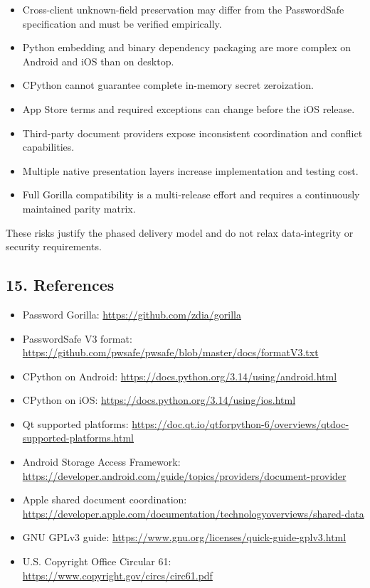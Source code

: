 \documentclass[
  letterpaper,
]{article}
\providecommand{\tightlist}{%
  \setlength{\itemsep}{0pt}\setlength{\parskip}{0pt}}
\begin{document}
\begin{itemize}
\tightlist
\item
  Cross-client unknown-field preservation may differ from the PasswordSafe specification and must be verified
  empirically.
\item
  Python embedding and binary dependency packaging are more complex on Android and iOS than on desktop.
\item
  CPython cannot guarantee complete in-memory secret zeroization.
\item
  App Store terms and required exceptions can change before the iOS release.
\item
  Third-party document providers expose inconsistent coordination and conflict capabilities.
\item
  Multiple native presentation layers increase implementation and testing cost.
\item
  Full Gorilla compatibility is a multi-release effort and requires a continuously maintained parity matrix.
\end{itemize}

These risks justify the phased delivery model and do not relax data-integrity or security requirements.

\subsection{15. References}\label{15-references}

\begin{itemize}
\tightlist
\item
  Password Gorilla: \url{https://github.com/zdia/gorilla}
\item
  PasswordSafe V3 format: \url{https://github.com/pwsafe/pwsafe/blob/master/docs/formatV3.txt}
\item
  CPython on Android: \url{https://docs.python.org/3.14/using/android.html}
\item
  CPython on iOS: \url{https://docs.python.org/3.14/using/ios.html}
\item
  Qt supported platforms: \url{https://doc.qt.io/qtforpython-6/overviews/qtdoc-supported-platforms.html}
\item
  Android Storage Access Framework: \url{https://developer.android.com/guide/topics/providers/document-provider}
\item
  Apple shared document coordination: \url{https://developer.apple.com/documentation/technologyoverviews/shared-data}
\item
  GNU GPLv3 guide: \url{https://www.gnu.org/licenses/quick-guide-gplv3.html}
\item
  U.S. Copyright Office Circular 61: \url{https://www.copyright.gov/circs/circ61.pdf}
\end{itemize}
\end{document}
